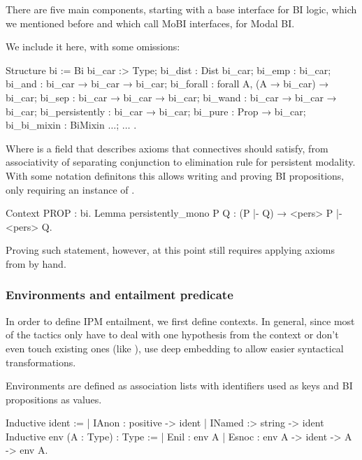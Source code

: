 There are five main components, starting with a base interface for BI logic, which we mentioned before and which \citet{krebbersMoSeLGeneralExtensible2018} call MoBI interfaces, for Modal BI.

We include it here, with some omissions:
\begin{coq}
Structure bi := Bi {
  bi_car :> Type;
  bi_dist : Dist bi_car;
  bi_emp : bi_car;
  bi_and : bi_car → bi_car → bi_car;
  bi_forall : forall A, (A → bi_car) → bi_car;
  bi_sep : bi_car → bi_car → bi_car;
  bi_wand : bi_car → bi_car → bi_car;
  bi_persistently : bi_car → bi_car;
  bi_pure : Prop → bi_car;
  bi_bi_mixin : BiMixin $\ldots$;
  $\ldots$
}.
\end{coq}

Where  is a field that describes axioms that connectives should satisfy, from associativity of separating conjunction to elimination rule for persistent modality.
With some notation definitons this allows writing and proving BI propositions, only requiring an instance of .

\begin{minipage}{\linewidth}
\begin{coq}
Context {PROP : bi}.
Lemma persistently_mono P Q : (P |- Q) → <pers> P |- <pers> Q.
\end{coq}
\end{minipage}

Proving such statement, however, at this point still requires applying axioms from  by hand.

\subsubsection{Environments and entailment predicate}
\label{subsubsec:environment-entailment-pred}

In order to define IPM entailment, we first define contexts.
In general, since most of the tactics only have to deal with one hypothesis from the context or don't even touch existing ones (like ), \citet{krebbersMoSeLGeneralExtensible2018} use deep embedding to allow easier syntactical transformations.

Environments are defined as association lists with identifiers used as keys and BI propositions as values.

\begin{coq}
Inductive ident :=
  | IAnon : positive -> ident
  | INamed :> string -> ident
Inductive env (A : Type) : Type :=
  | Enil : env A
  | Esnoc : env A -> ident -> A -> env A.
\end{coq}

